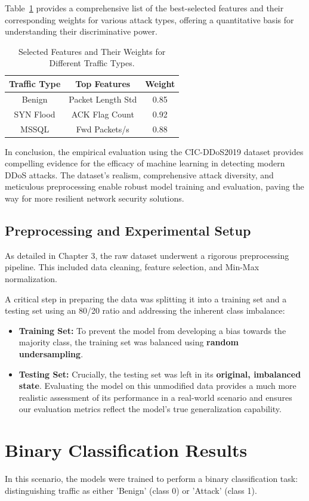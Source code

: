 \documentclass[12pt]{report}
\begin{document}
Table~\ref{tab:feature_weights} provides a comprehensive list of the best-selected features and their corresponding weights for various attack types, offering a quantitative basis for understanding their discriminative power.

\begin{table}[htbp]
\centering
\caption{Selected Features and Their Weights for Different Traffic Types.}
\label{tab:feature_weights}
\begin{tabular}{|c|c|c|}
\hline
\textbf{Traffic Type} & \textbf{Top Features} & \textbf{Weight} \\
\hline
Benign & Packet Length Std & 0.85 \\
SYN Flood & ACK Flag Count & 0.92 \\
MSSQL & Fwd Packets/s & 0.88 \\
\hline
\end{tabular}
\end{table}

In conclusion, the empirical evaluation using the CIC-DDoS2019 dataset provides compelling evidence for the efficacy of machine learning in detecting modern DDoS attacks. The dataset's realism, comprehensive attack diversity, and meticulous preprocessing enable robust model training and evaluation, paving the way for more resilient network security solutions.

\subsection{Preprocessing and Experimental Setup}
As detailed in Chapter 3, the raw dataset underwent a rigorous preprocessing pipeline. This included data cleaning, feature selection, and Min-Max normalization.

A critical step in preparing the data was splitting it into a training set and a testing set using an 80/20 ratio and addressing the inherent class imbalance:
\begin{itemize}
    \item \textbf{Training Set:} To prevent the model from developing a bias towards the majority class, the training set was balanced using \textbf{random undersampling}.
    \item \textbf{Testing Set:} Crucially, the testing set was left in its \textbf{original, imbalanced state}. Evaluating the model on this unmodified data provides a much more realistic assessment of its performance in a real-world scenario and ensures our evaluation metrics reflect the model's true generalization capability.
\end{itemize}\section{Binary Classification Results}
In this scenario, the models were trained to perform a binary classification task: distinguishing traffic as either 'Benign' (class 0) or 'Attack' (class 1).
\end{document}
